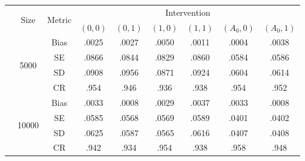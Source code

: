 \begin{tabular}{ccc|cccccc}
	\toprule
	& \multirow{2}{*}{Size} & \multirow{2}{*}{Metric} & \multicolumn{6}{c}{Intervention} \\
	&&& $(0,0)$ & $(0,1)$ & $(1,0)$ & $(1,1)$ & $(A_0,0)$ & $(A_0,1)$ \\
	\midrule
	& \multirow{4}{*}{5000} & Bias & .0025 & .0027 & .0050 & .0011 & .0004 & .0038 \\
	&  & SE & .0866 & .0844 & .0829 & .0860 & .0584 & .0586 \\
	&  & SD & .0908 & .0956 & .0871 & .0924 & .0604 & .0614 \\
	&  & CR & .954 & .946 & .936 & .938 & .954 & .952 \\[5pt]
	& \multirow{4}{*}{10000} & Bias & .0033 & .0008 & .0029 & .0037 & .0033 & .0008 \\
	&  & SE & .0585 & .0568 & .0569 & .0589 & .0401 & .0402 \\
	&  & SD & .0625 & .0587 & .0565 & .0616 & .0407 & .0408 \\
	&  & CR & .942 & .934 & .954 & .938 & .958 & .948 \\
	\bottomrule
\end{tabular}